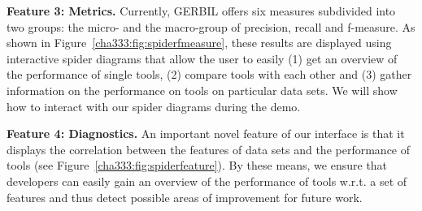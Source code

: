 \textbf{Feature 3: Metrics.}
Currently, GERBIL offers six measures subdivided into two groups: the micro- and the macro-group of precision, recall and f-measure. As shown in Figure~\ref{cha333:fig:spiderfmeasure}, these results are displayed using interactive spider diagrams that allow the user to easily (1) get an overview of the performance of single tools, (2) compare tools with each other and (3) gather information on the performance on tools on particular data sets. We will show how to interact with our spider diagrams during the demo.

\textbf{Feature 4: Diagnostics.}
An important novel feature of our interface is that it displays the correlation between the features of data sets and the performance of tools (see Figure~\ref{cha333:fig:spiderfeature}). By these means, we ensure that developers can easily gain an overview of the performance of tools w.r.t. a set of features and thus detect possible areas of improvement for future work. 

